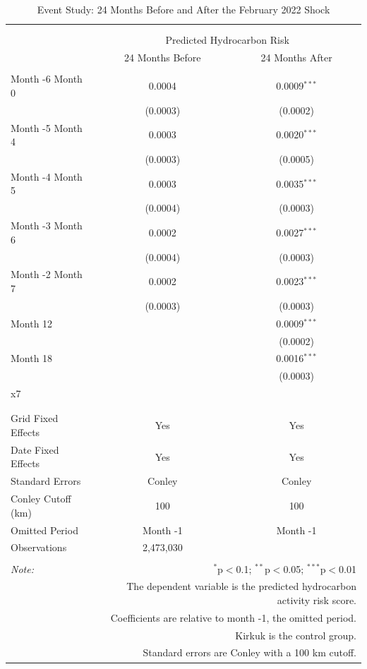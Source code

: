 
\begin{table}[!htbp] \centering 
  \caption{Event Study: 24 Months Before and After the February 2022 Shock} 
  \label{tab:eventstudy_24m_pre_post} 
\scriptsize 
\begin{tabular}{@{\extracolsep{5pt}}lcc} 
\\[-1.8ex]\hline 
\hline \\[-1.8ex] 
\\[-1.8ex] & \multicolumn{2}{c}{Predicted Hydrocarbon Risk} \\ 
 & 24 Months Before & 24 Months After \\ 
\hline \\[-1.8ex] 
 Month -6  \hfill  Month 0 & 0.0004 & 0.0009$^{***}$ \\ 
  & (0.0003) & (0.0002) \\ 
  Month -5  \hfill  Month 4 & 0.0003 & 0.0020$^{***}$ \\ 
  & (0.0003) & (0.0005) \\ 
  Month -4  \hfill  Month 5 & 0.0003 & 0.0035$^{***}$ \\ 
  & (0.0004) & (0.0003) \\ 
  Month -3  \hfill  Month 6 & 0.0002 & 0.0027$^{***}$ \\ 
  & (0.0004) & (0.0003) \\ 
  Month -2  \hfill  Month 7 & 0.0002 & 0.0023$^{***}$ \\ 
  & (0.0003) & (0.0003) \\ 
  Month 12 &  & 0.0009$^{***}$ \\ 
  &  & (0.0002) \\ 
  Month 18 &  & 0.0016$^{***}$ \\ 
  &  & (0.0003) \\ 
  x7 &  &  \\ 
  &  &  \\ 
 \hline \\[-1.8ex] 
Grid Fixed Effects & Yes & Yes \\ 
Date Fixed Effects & Yes & Yes \\ 
Standard Errors & Conley & Conley \\ 
Conley Cutoff (km) & 100 & 100 \\ 
Omitted Period & Month -1 & Month -1 \\ 
Observations & 2,473,030 &  \\ 
\hline 
\hline \\[-1.8ex] 
\textit{Note:}  & \multicolumn{2}{r}{$^{*}$p$<$0.1; $^{**}$p$<$0.05; $^{***}$p$<$0.01} \\ 
 & \multicolumn{2}{r}{The dependent variable is the predicted hydrocarbon activity risk score.} \\ 
 & \multicolumn{2}{r}{Coefficients are relative to month -1, the omitted period.} \\ 
 & \multicolumn{2}{r}{Kirkuk is the control group.} \\ 
 & \multicolumn{2}{r}{Standard errors are Conley with a 100 km cutoff.} \\ 
\end{tabular} 
\end{table} 
